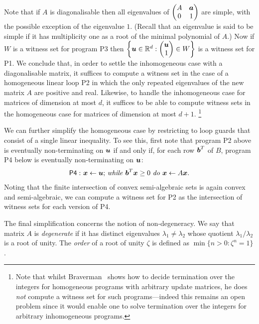Note that if $A$ is diagonalisable then all
eigenvalues of
$\begin{pmatrix}A&\boldsymbol{a}\\ 0 & 1
\end{pmatrix}$ are simple, with the possible exception of the
eigenvalue $1$.  (Recall that an eigenvalue is said to be simple if it
has multiplicity one as a root of the minimal polynomial of $A$.)  Now
if $W$ is a witness set for program \textsf{P3} then $\left\lbrace
  \boldsymbol{u} \in \mathbb{R}^{d} : \begin{pmatrix} \boldsymbol{u}\\
    1\end{pmatrix} \in W \right\rbrace$ is a witness set for \textsf{P1}.
We conclude that, in order to settle the inhomogeneous case with a
diagonalisable matrix, it suffices to compute a witness set in the
case of a homogeneous linear loop \textsf{P2} in which the only
repeated eigenvalues of the new matrix $A$ are positive and real.
Likewise, to handle the inhomogeneous case for matrices of dimension
at most $d$, it suffices to be able to compute witness sets in the
homogeneous case for matrices of dimension at most $d+1$.%
\footnote{Note that whilst Braverman~\cite{Bra06} shows how to decide
  termination over the integers for homogeneous programs with
  arbitrary update matrices, he does \emph{not} compute a witness set
  for such programs---indeed this remains an open problem since it
  would enable one to solve termination over the integers for
  arbitrary inhomogeneous programs.}

We can further simplify the homogeneous case by restricting to loop
guards that consist of a single linear inequality.  To see this, first
note that program \textsf{P2} above is eventually non-terminating on
$\boldsymbol{u}$ if and only if, for each row $\boldsymbol{b}^T$ of $B$,
program \textsf{P4} below is eventually non-terminating on
$\boldsymbol{u}$:
\begin{gather*}
\mathsf{P4:}\ \mbox{$\boldsymbol{x}\gets \boldsymbol{u}$;
\textit{while} $\boldsymbol{b}^T\boldsymbol{x} \geq 0$ \textit{do} $\boldsymbol{x}\leftarrow A\boldsymbol{x}$.}
\end{gather*}
Noting that the finite intersection of convex semi-algebraic sets is
again convex and semi-algebraic, we can compute a witness set
for \textsf{P2} as the intersection of witness sets for each version
of \textsf{P4}.

The final simplification concerns the notion of
non-degeneracy.  We say that matrix $A$ is \emph{degenerate} if it has
distinct eigenvalues $\lambda_1 \neq \lambda_2$ whose quotient
$\lambda_1/\lambda_2$ is a root of unity.
The \emph{order} of a root of unity $\zeta$ is defined as
$\min\lbrace n > 0 : \zeta^{n} = 1 \rbrace$.

